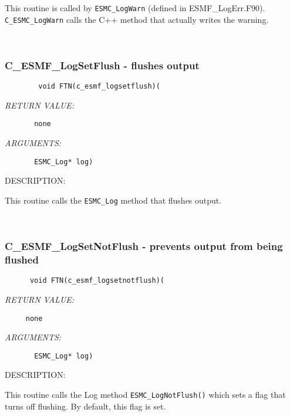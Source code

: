       This routine is called by {\tt ESMC\_LogWarn} (defined in ESMF\_LogErr.F90).  
      {\tt C\_ESMC\_LogWarn} calls the C++ method that actually writes the warning.
   
 
\mbox{}\hrulefill\ 
 
\subsubsection [C\_ESMF\_LogSetFlush] {C\_ESMF\_LogSetFlush - flushes output}


  
\begin{verbatim}        void FTN(c_esmf_logsetflush)(\end{verbatim}{\em RETURN VALUE:}
\begin{verbatim}       none\end{verbatim}{\em ARGUMENTS:}
\begin{verbatim}    
       ESMC_Log* log)\end{verbatim}
{\sf DESCRIPTION:\\ }


    This routine calls the {\tt ESMC\_Log} method that flushes output.
   
 
\mbox{}\hrulefill\ 
 
\subsubsection [C\_ESMF\_LogSetNotFlush] {C\_ESMF\_LogSetNotFlush - prevents output from being flushed}


  
\begin{verbatim}      void FTN(c_esmf_logsetnotflush)(\end{verbatim}{\em RETURN VALUE:}
\begin{verbatim}     none\end{verbatim}{\em ARGUMENTS:}
\begin{verbatim}       ESMC_Log* log)
 \end{verbatim}
{\sf DESCRIPTION:\\ }


      This routine calls the Log method {\tt ESMC\_LogNotFlush()} which sets a flag
      that turns off flushing. By default, this flag is set.
   
